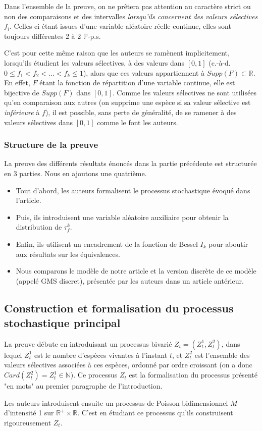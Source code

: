\documentclass[12pt,a4paper]{article}
\begin{document}
Dans l'ensemble de la preuve, on ne prêtera pas attention au caractère strict ou non des comparaisons et des intervalles \textit{lorsqu'ils concernent des valeurs sélectives $f_i$}. Celles-ci étant issues d'une variable aléatoire réelle continue, elles sont toujours différentes 2 à 2 $\mathbb{P}$-p.s.\par 

C'est pour cette même raison que les auteurs se ramènent implicitement, lorsqu'ils étudient les valeurs sélectives, à des valeurs dans $[0,1]$ (c.-à-d. $0 \leq f_1 < f_2 < ... < f_k \leq 1$), alors que ces valeurs appartiennent à $Supp(F) \subset\mathbb{R}$. En effet, $F$ étant la fonction de répartition d'une variable continue, elle est bijective de $Supp(F)$ dans $[0,1]$. Comme les valeurs sélectives ne sont utilisées qu'en comparaison aux autres (on supprime une espèce si sa valeur sélective est \textit{inférieure} à $f$), il est possible, sans perte de généralité, de se ramener à des valeurs sélectives dans $[0,1]$ comme le font les auteurs. 

\subsubsection{Structure de la preuve}

La preuve des différents résultats énoncés dans la partie précédente est structurée en 3 parties. Nous en ajoutons une quatrième.
\begin{itemize}
    \item Tout d'abord, les auteurs formalisent le processus stochastique évoqué dans l'article.
    \item Puis, ils introduisent une variable aléatoire auxiliaire pour obtenir la distribution de $\tau_f^k$.
    \item Enfin, ils utilisent un encadrement de la fonction de Bessel $I_k$ pour aboutir aux résultats sur les équivalences.
    \item Nous comparons le modèle de notre article et la version discrète de ce modèle (appelé GMS discret), présentée par les auteurs dans un article antérieur.    
\end{itemize}

\subsection{Construction et formalisation du processus stochastique principal}
La preuve débute en introduisant un processus bivarié $Z_t = (Z_t^1, Z_t^2)$, dans lequel $Z_t^1$ est le nombre d'espèces vivantes à l'instant $t$, et $Z_t^2$ est l'ensemble des valeurs sélectives associées à ces espèces, ordonné par ordre croissant (on a donc $Card(Z_t^2) = Z_t^1 \in \mathbb{N}$). Ce processus $Z_t$ est la formalisation du processus présenté "en mots" au premier paragraphe de l'introduction.\par
Les auteurs introduisent ensuite un processus de Poisson bidimensionnel $M$ d'intensité 1 sur $\mathbb{R}^+ \times \mathbb{R}$. C'est en étudiant ce processus qu'ils construisent rigoureusement $Z_t$. \par
\end{document}
